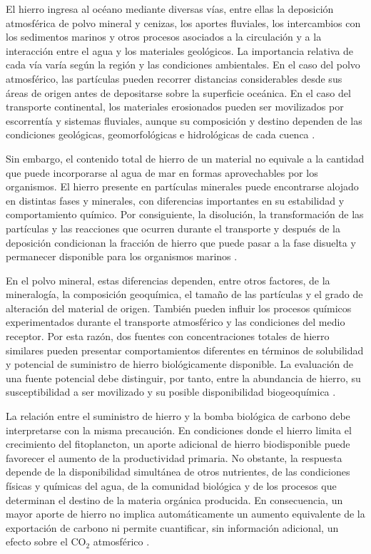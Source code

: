 El hierro ingresa al océano mediante diversas vías, entre ellas la deposición atmosférica de polvo mineral y cenizas, los aportes fluviales, los intercambios con los sedimentos marinos y otros procesos asociados a la circulación y a la interacción entre el agua y los materiales geológicos. La importancia relativa de cada vía varía según la región y las condiciones ambientales. En el caso del polvo atmosférico, las partículas pueden recorrer distancias considerables desde sus áreas de origen antes de depositarse sobre la superficie oceánica. En el caso del transporte continental, los materiales erosionados pueden ser movilizados por escorrentía y sistemas fluviales, aunque su composición y destino dependen de las condiciones geológicas, geomorfológicas e hidrológicas de cada cuenca \citep{Tagliabue2017,Zan2025}.

Sin embargo, el contenido total de hierro de un material no equivale a la cantidad que puede incorporarse al agua de mar en formas aprovechables por los organismos. El hierro presente en partículas minerales puede encontrarse alojado en distintas fases y minerales, con diferencias importantes en su estabilidad y comportamiento químico. Por consiguiente, la disolución, la transformación de las partículas y las reacciones que ocurren durante el transporte y después de la deposición condicionan la fracción de hierro que puede pasar a la fase disuelta y permanecer disponible para los organismos marinos \citep{Tagliabue2017,Zan2025}.

En el polvo mineral, estas diferencias dependen, entre otros factores, de la mineralogía, la composición geoquímica, el tamaño de las partículas y el grado de alteración del material de origen. También pueden influir los procesos químicos experimentados durante el transporte atmosférico y las condiciones del medio receptor. Por esta razón, dos fuentes con concentraciones totales de hierro similares pueden presentar comportamientos diferentes en términos de solubilidad y potencial de suministro de hierro biológicamente disponible. La evaluación de una fuente potencial debe distinguir, por tanto, entre la abundancia de hierro, su susceptibilidad a ser movilizado y su posible disponibilidad biogeoquímica \citep{Zan2025}.

La relación entre el suministro de hierro y la bomba biológica de carbono debe interpretarse con la misma precaución. En condiciones donde el hierro limita el crecimiento del fitoplancton, un aporte adicional de hierro biodisponible puede favorecer el aumento de la productividad primaria. No obstante, la respuesta depende de la disponibilidad simultánea de otros nutrientes, de las condiciones físicas y químicas del agua, de la comunidad biológica y de los procesos que determinan el destino de la materia orgánica producida. En consecuencia, un mayor aporte de hierro no implica automáticamente un aumento equivalente de la exportación de carbono ni permite cuantificar, sin información adicional, un efecto sobre el CO$_2$ atmosférico \citep{Tagliabue2017,Lambert2021}.


